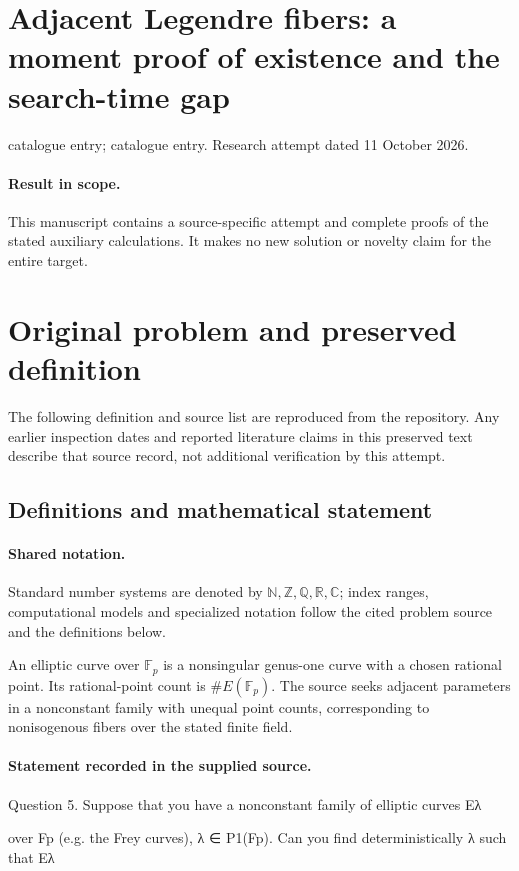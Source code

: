 \documentclass[11pt]{article}
\begin{document}
\section*{Adjacent Legendre fibers: a moment proof of existence and the search-time gap}
\noindent catalogue entry; catalogue entry. Research attempt dated 11 October 2026.
\paragraph{Result in scope.}This manuscript contains a source-specific attempt and complete proofs of the stated auxiliary calculations. It makes no new solution or novelty claim for the entire target.
\section{Original problem and preserved definition}
The following definition and source list are reproduced from the repository. Any earlier inspection dates and reported literature claims in this preserved text describe that source record, not additional verification by this attempt.
\subsection{Definitions and mathematical statement}

\paragraph{Shared notation.}Standard number systems are denoted by $\mathbb N,\mathbb Z,\mathbb Q,\mathbb R,\mathbb C$; index ranges, computational models and specialized notation follow the cited problem source and the definitions below.


An elliptic curve over $\mathbb F_p$ is a nonsingular genus-one curve with a chosen rational point. Its rational-point count is $\#E(\mathbb F_p)$. The source seeks adjacent parameters in a nonconstant family with unequal point counts, corresponding to nonisogenous fibers over the stated finite field.
\paragraph{Statement recorded in the supplied source.}
Question 5. Suppose that you have a nonconstant family of elliptic curves Eλ

over Fp (e.g. the Frey curves), λ ∈ P1(Fp). Can you find deterministically λ such that Eλ
\end{document}
